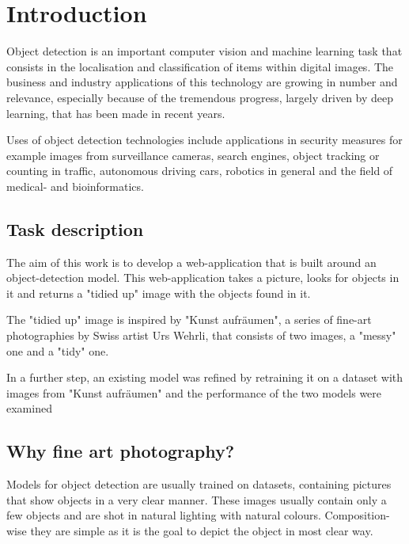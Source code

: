 \chapter{Introduction}
\label{Introduction}
Object detection is an important computer vision and machine learning task that consists in the localisation and classification of items within digital images. The business and industry applications of this technology are growing in number and relevance, especially because of the tremendous progress, largely driven by deep learning, that has been made in recent years.

Uses of object detection technologies include applications in security measures for example images from surveillance cameras, search engines, object tracking or counting in traffic, autonomous driving cars, robotics in general and the field of medical- and bioinformatics.

\section{Task description}
The aim of this work is to develop a web-application that is built around an object-detection model. This web-application takes a picture, looks for objects in it and returns a "tidied up" image with the objects found in it.

The "tidied up" image is inspired by "Kunst aufräumen", a series of fine-art photographies by Swiss artist Urs Wehrli, that consists of two images, a "messy" one and a "tidy" one.

In a further step, an existing model was refined by retraining it on a dataset with images from "Kunst aufräumen" and the performance of the two models were examined

\section{Why fine art photography?}
Models for object detection are usually trained on datasets, containing pictures that show objects in a very clear manner. These images usually contain only a few objects and are shot in natural lighting with natural colours. Composition-wise they are simple as it is the goal to depict the object in most clear way.


